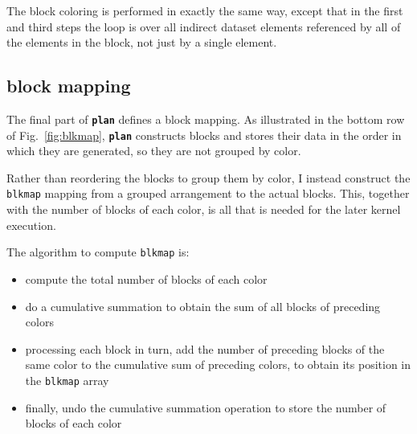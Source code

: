 \documentclass[12pt]{article}
\begin{document}
The block coloring is performed in exactly the same way, except 
that in the first and third steps the loop is over all indirect
dataset elements referenced by all of the elements in the block, 
not just by a single element.

\newpage

\subsection{block mapping}

The final part of {\tt \bf plan} defines a block mapping.
As illustrated in the bottom row of Fig.~\ref{fig:blkmap}, 
{\tt \bf plan} constructs blocks and stores their data in 
the order in which they are generated, so they are not 
grouped by color.

Rather than reordering the blocks to group them by color, 
I instead construct the {\tt blkmap} mapping from a grouped 
arrangement to the actual blocks.  This, together with the 
number of blocks of each color, is all that is needed for 
the later kernel execution.

The algorithm to compute {\tt blkmap} is:
\begin{itemize}
\item
compute the total number of blocks of each color
\item
do a cumulative summation to obtain the sum
of all blocks of preceding colors
\item
processing each block in turn, add the number of preceding
blocks of the same color to the cumulative sum of
preceding colors, to obtain its position in the {\tt blkmap} 
array
\item
finally, undo the cumulative summation operation to store 
the number of blocks of each color
\end{itemize}
\end{document}
